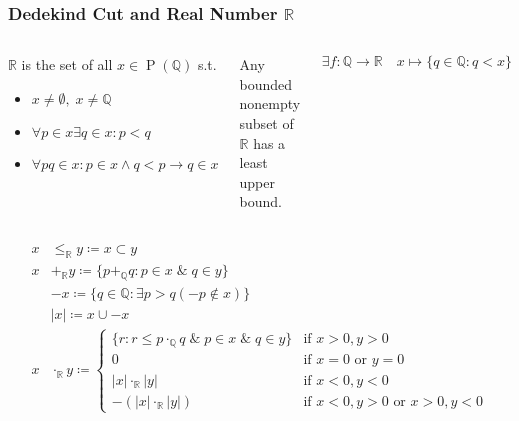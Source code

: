 \documentclass[UTF8,aspectratio=43,11pt,colorlinks,compress,openany]{beamer}%
\begin{document}
\begin{frame}\frametitle{Dedekind Cut and Real Number $\mathbb{R}$}
	\begin{columns}
	\begin{definition}
		$\mathbb{R}$ is the set of all $x\in \operatorname{P}(\mathbb{Q})$ s.t.
		\begin{itemize}
			\item $x\neq\emptyset,\;x\neq\mathbb{Q}$
			\item $\forall p\in x\exists q\in x: p<q$
			\item $\forall pq\in x: p\in x\wedge q<p\to q\in x$
		\end{itemize}
	\end{definition}
	\begin{theorem}
		Any bounded nonempty subset of $\mathbb{R}$ has a least upper bound.
	\end{theorem}\vspace{-3ex}
	\[\exists f:\mathbb{Q}\to\mathbb{R}\quad x\mapsto\{q\in\mathbb{Q}: q<x\}\]
	\end{columns}\vspace{-1ex}
	\begin{align*}
		x&\leq_{\mathbb{R}}y\coloneqq x\subset y\\
		x&+_{\mathbb{R}}y\coloneqq \{p+_{\mathbb{Q}}q: p\in x\;\&\;q\in y\}\\
		&-x\coloneqq \{q\in\mathbb{Q}: \exists p>q(-p\notin x)\}\\
		&|x|\coloneqq x\cup-x\\
		x&\cdot_{\mathbb{R}}y\coloneqq 
		\begin{cases}
			\{r: r\leq p\cdot_{\mathbb{Q}}q\;\&\;p\in x\;\&\;q\in y\} &\mbox{if $x>0, y>0$}\\
			0 &\mbox{if $x=0$ or $y=0$}\\
			|x|\cdot_{\mathbb{R}}|y| &\mbox{if $x<0, y<0$}\\
			-(|x|\cdot_{\mathbb{R}}|y|) &\mbox{if $x<0,y>0$ or $x>0,y<0$}
		\end{cases}
	\end{align*}
\end{frame}
\end{document}
